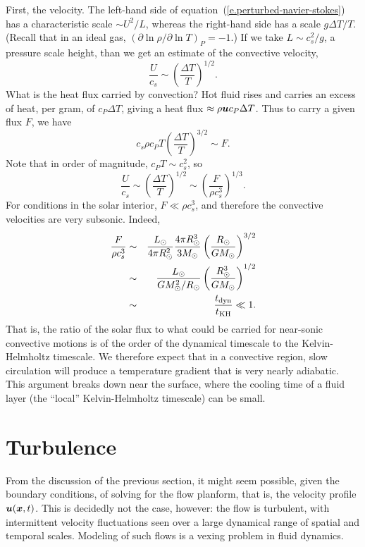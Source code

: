 First, the velocity.  The left-hand side of equation~(\ref{e.perturbed-navier-stokes}) has a characteristic scale $\sim U^{2}/L$, whereas the right-hand side has a scale $g\Delta T/T$. (Recall that in an ideal gas, $(\partial\ln \rho/\partial\ln T)_{P} = -1$.)  If we take $L \sim c_{s}^{2}/g$, a pressure scale height, than we get an estimate of the convective velocity,
\begin{equation}\label{e.convective-velocity-estimate}
\frac{U}{c_{s}} \sim \left(\frac{\Delta T}{T}\right)^{1/2}.
\end{equation}
What is the heat flux carried by convection? Hot fluid rises and carries an excess of heat, per gram, of $c_{P}\Delta T$, giving a heat flux $\approx \rho \bm{u} c_{P}\Delta T$. Thus to carry a given flux $F$, we have
\begin{equation}\label{e.convective-flux-estimate}
c_{s}\rho c_{P} T\left(\frac{\Delta T}{T}\right)^{3/2} \sim F.
\end{equation}
Note that in order of magnitude, $c_{P}T \sim c_{s}^{2}$, so 
\[
\frac{U}{c_{s}} \sim \left(\frac{\Delta T}{T}\right)^{1/2} \sim \left(\frac{F}{\rho c_{s}^{3}}\right)^{1/3}.
\]
For conditions in the solar interior, $F \ll \rho c_{s}^{3}$, and therefore the convective velocities are very subsonic. Indeed,
\begin{eqnarray*}
 \frac{F}{\rho c_{s}^{3}} &\sim& \frac{L_{\odot}}{4\pi R_{\odot}^{2}}\frac{4\pi R_{\odot}^{3}}{3M_\odot}\left(\frac{R_{\odot}}{GM_\odot}\right)^{3/2}\\
  &\sim& \frac{L_{\odot}}{GM_\odot^{2}/R_{\odot}}\left(\frac{R_{\odot}^{3}}{GM_\odot}\right)^{1/2} \\
 	&\sim& \frac{t_{\mathrm{dyn}}}{t_{\mathrm{KH}}} \ll 1.
\end{eqnarray*}
That is, the ratio of the solar flux to what could be carried for near-sonic convective motions is of the order of the dynamical timescale to the Kelvin-Helmholtz timescale.
We therefore expect that in a convective region, slow circulation will produce a temperature gradient that is very nearly adiabatic. This argument breaks down near the surface, where the cooling time of a fluid layer (the ``local'' Kelvin-Helmholtz timescale) can be small.

\section{Turbulence}
 
From the discussion of the previous section, it might seem possible, given the boundary conditions, of solving for the flow planform, that is, the velocity profile $\bm{u}(\bm{x},t)$. This is decidedly not the case, however: the flow is turbulent, with intermittent velocity fluctuations seen over a large dynamical range of spatial and temporal scales. Modeling of such flows is a vexing problem in fluid dynamics.

